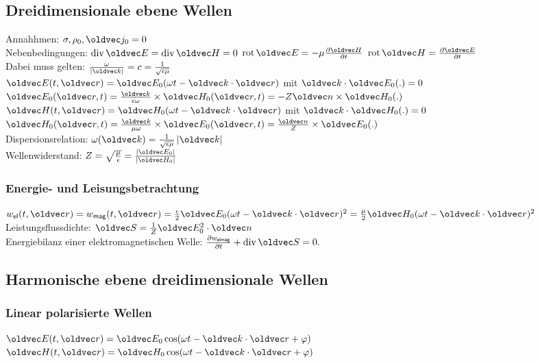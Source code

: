 \documentclass[6pt,a4paper]{scrartcl}
\let\vec\oldvec
\begin{document}
\begin{multicols}{4}
	\subsection{Dreidimensionale ebene Wellen}
	Annahhmen: $\sigma, \rho_0, \vec j_0 = 0$ \\
	Nebenbedingungen: $\div\vec E =\div \vec H = 0$ \quad $\rot \vec E = -\mu\frac{\partial\vec H}{\partial t}$ \quad $\rot \vec H = \frac{\partial\vec E}{\partial t}$\\
	\boxed{\vec k = k\vec n, \omega=kc} Dabei muss gelten: $\frac{\omega}{\abs{\vec k}} = c = \frac{1}{\sqrt{\epsilon\mu}}$\\
	$\vec E(t,\vec r) = \vec E_0(\omega t-\vec k\cdot\vec r)$ mit $\vec k\cdot\vec E_0(.) = 0$\\
	$\vec E_0(\vec r,t) =\frac{\vec k}{\epsilon \omega} \times \vec H_0(\vec r,t) = -Z\vec n \times \vec H_0(.)$\\
	$\vec H(t,\vec r) = \vec H_0(\omega t-\vec k\cdot\vec r)$ mit $\vec k\cdot\vec H_0(.) = 0$\\
	$\vec H_0(\vec r,t) =\frac{\vec k}{\mu \omega} \times \vec E_0(\vec r,t)= \frac{\vec n}{Z}\times \vec E_0(.)$\\
	Dispersionsrelation: $\omega(\vec k) = \frac{1}{\sqrt{\epsilon\mu}}\abs{\vec k}$\\
	Wellenwiderstand: $Z = \sqrt{\frac{\mu}{\epsilon}} = \frac{\abs{\vec E_0}}{\abs{\vec H_0}}$\\
	\subsubsection{Energie- und Leisungsbetrachtung}
	$w_{\ir el}(t,\vec r) = w_{\ir mag}(t,\vec r) = \frac{\epsilon}{2}\vec E_0(\omega t-\vec k\cdot\vec r)^2 = \frac{\mu}{2}\vec H_0(\omega t-\vec k\cdot\vec r)^2$\\
	Leistungsflussdichte: $\vec S = \frac{1}{Z}\vec E_0^2\cdot\vec n$\\
	Energiebilanz einer elektromagnetischen Welle: $\frac{\partial w_{\ir elmag}}{\partial t} + \div \vec S = 0.$\\
	\subsection{Harmonische ebene dreidimensionale Wellen}
	\subsubsection{Linear polarisierte Wellen}
	$\vec E(t,\vec r) = \vec E_0\cos(\omega t-\vec k\cdot\vec r + \varphi)$\\
	$\vec H(t,\vec r) = \vec H_0\cos(\omega t-\vec k\cdot\vec r + \varphi)$\\	

\end{multicols}
\end{document}
